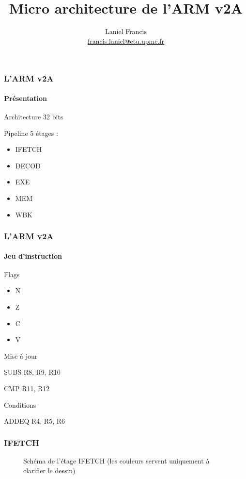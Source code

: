 \documentclass{beamer}
\title{Micro architecture de l'ARM v2A}
\author{
  Laniel Francis\\
  \href{mailto:francis.laniel@etu.upmc.fr}{francis.laniel@etu.upmc.fr}
}
\begin{document}
	\maketitle
	\begin{frame}
		\frametitle{L'ARM v2A}
		\framesubtitle{Présentation}
		\begin{block}{Architecture}
			32 bits
		\end{block}
		\begin{block}{Pipeline}
			5 étages :
			\begin{itemize}
				\item IFETCH
				\item DECOD
				\item EXE
				\item MEM
				\item WBK
			\end{itemize}
		\end{block}
	\end{frame}
	
	\begin{frame}
		\frametitle{L'ARM v2A}
		\framesubtitle{Jeu d'instruction}
		\begin{block}{Flags}
			\begin{itemize}
				\item N
				\item Z
				\item C
				\item V
			\end{itemize}
		\end{block}

		\begin{exampleblock}{Mise à jour}
			\begin{semiverbatim}
				SUB\alert{S} R8, R9, R10
				
				CMP R11, R12
			\end{semiverbatim}
		\end{exampleblock}

		
		\begin{exampleblock}{Conditions}
			\begin{semiverbatim}
				ADD\alert{EQ} R4, R5, R6
			\end{semiverbatim}
		\end{exampleblock}
	\end{frame}
	
	\begin{frame}
		\frametitle{IFETCH}
		\begin{figure}[H]
			\centering
			\def\svgwidth{\columnwidth}
			\tiny{
				
			}
			\caption{Schéma de l'étage IFETCH (les couleurs servent uniquement à clarifier le dessin)}
		\end{figure}
	\end{frame}
	
\end{document}
